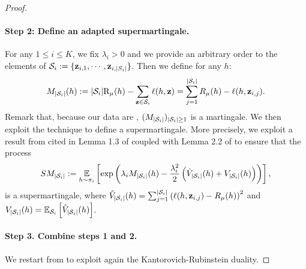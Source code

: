 \documentclass{article}
\begin{document}
\begin{proof}
\paragraph{Step 2: Define an adapted supermartingale.}
    For any $1\leq i \leq K$, we fix $\lambda_i>0$ and we provide an arbitrary order to the elements of $\S_i\defeq \{\z_{i,1},\cdots,\z_{i,|S_i|}\}$. Then we define for any $h$: 
    \begin{align*}
    M_{|\S_i|}(h)\defeq   |\S_i|\Risk_{\D}(h) - \sum_{\z\in\S_i} \loss(h, \z) = \sum_{j=1}^{|\S_i|} R_\D(h) - \loss(h,\z_{i,j}).
    \end{align*}
    Remark that, because our data are \iid, $(M_{|\S_i|})_{|\S_i|\geq 1}$ is a martingale.
    We then exploit the technique \cite{haddouche2023pac} to define a supermartingale.
    More precisely, we exploit a result from \cite{bercu2008exponential} cited in Lemma 1.3 of \cite{haddouche2023pac} coupled with Lemma 2.2 of \cite{haddouche2023pac} to ensure that the process
    \begin{align*}
    SM_{|\S_i|} \defeq \EE_{h\sim \P_i} \LB\exp\left(\lambda_i M_{|\S_i|}(h) - \frac{\lambda_i^2}{2}\left( \Vhat_{|\S_i|}(h) + V_{|\S_i|}(h) \right)\right)\RB,
    \end{align*}
    is a supermartingale, where $\Vhat_{|\S_i|}(h)= \sum_{j=1}^{|\S_i|} \left(\loss(h,\z_{i,j}) - R_\D(h)\right)^2$ and $V_{|\S_i|}(h) = \EE_{\S_i} \LB \Vhat_{|\S_i|}(h) \RB $.



\paragraph{Step 3. Combine steps 1 and 2.}
    
    We restart from  to exploit again the Kantorovich-Rubinstein duality.


\end{proof}
\end{document}
